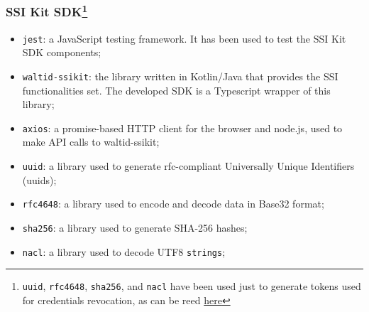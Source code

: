 \subsubsection[SSI Kit SDK]{SSI Kit SDK\footnote{\texttt{uuid}, \texttt{rfc4648}, 
\texttt{sha256}, and \texttt{nacl} have been used just to generate tokens used for 
credentials revocation, as can be reed \hyperref[method:isRevoked]{here}}}

\begin{itemize}
    \setlength\itemsep{-0.1em}
    \item \texttt{jest}: a JavaScript testing framework. It has been used to test
    the SSI Kit SDK components;
    \item \texttt{waltid-ssikit}: the library written in Kotlin/Java that provides 
    the SSI functionalities set. The developed SDK is a Typescript wrapper of this 
    library;
    \item \texttt{axios}: a promise-based HTTP client for the browser and node.js,
    used to make API calls to waltid-ssikit;
    \item \texttt{uuid}: a library used to generate \acrshort{rfc}-compliant Universally Unique
    Identifiers (\acrshort{uuid}s);
    \item \texttt{rfc4648}: a library used to encode and decode data in Base32 format;
    \item \texttt{sha256}: a library used to generate SHA-256 hashes;
    \item \texttt{nacl}: a library used to decode UTF8 \texttt{strings};
\end{itemize}

